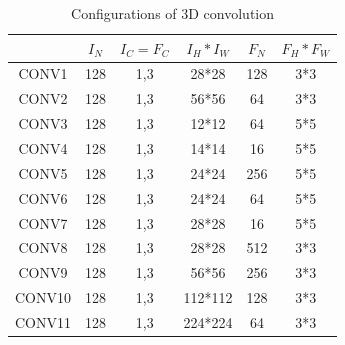 \begin{table}[]
\caption{Configurations of 3D convolution}
\label{tab:3dconvconfigs}
\begin{tabular}{c|ccccc}
\hline
& $I_N$ & $I_C=F_C$ & $I_H*I_W$ & $F_N$ & $F_H*F_W$ \\
\hline
CONV1 & 128  & 1,3       & 28*28     & 128  & 3*3       \\
CONV2 & 128  & 1,3       & 56*56     & 64   & 3*3       \\
CONV3 & 128  & 1,3       & 12*12     & 64   & 5*5       \\
CONV4 & 128  & 1,3       & 14*14     & 16   & 5*5       \\
CONV5 & 128  & 1,3       & 24*24    & 256  & 5*5       \\
CONV6 & 128  & 1,3       & 24*24     & 64   & 5*5       \\
CONV7 & 128  & 1,3       & 28*28     & 16   & 5*5       \\
CONV8 & 128  & 1,3       & 28*28     & 512   & 3*3       \\
CONV9 & 128  & 1,3       & 56*56     & 256  & 3*3       \\
CONV10 & 128  & 1,3       & 112*112     & 128   & 3*3       \\
CONV11 & 128  & 1,3       & 224*224     & 64   & 3*3      \\
\hline
\end{tabular}
\end{table}

